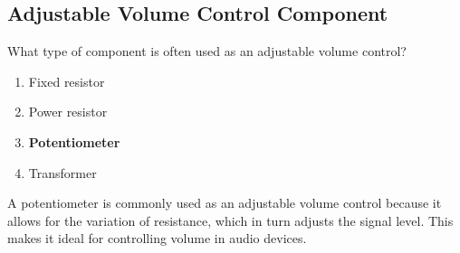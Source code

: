 \subsection{Adjustable Volume Control Component}
\label{T6A02}

\begin{tcolorbox}[colback=gray!10!white,colframe=black!75!black,title=T6A02]
What type of component is often used as an adjustable volume control?
\begin{enumerate}[noitemsep]
    \item Fixed resistor
    \item Power resistor
    \item \textbf{Potentiometer}
    \item Transformer
\end{enumerate}
\end{tcolorbox}

A potentiometer is commonly used as an adjustable volume control because it allows for the variation of resistance, which in turn adjusts the signal level. This makes it ideal for controlling volume in audio devices.